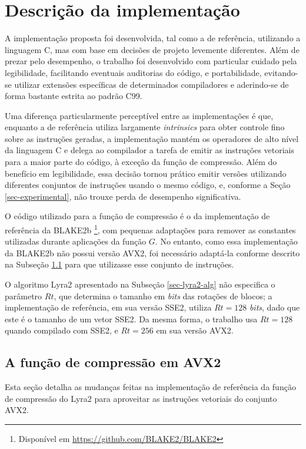 \documentclass{article}
\begin{document}
\section{Descrição da implementação}

A implementação proposta foi desenvolvida, tal como a de referência, utilizando
a linguagem C, mas com base em decisões de projeto levemente diferentes. Além
de prezar pelo desempenho, o trabalho foi desenvolvido com particular cuidado
pela legibilidade, facilitando eventuais auditorias do código, e portabilidade,
evitando-se utilizar extensões específicas de determinados compiladores e
aderindo-se de forma bastante estrita ao padrão C99.

Uma diferença particularmente perceptível entre as implementações é que,
enquanto a de referência utiliza largamente \emph{intrinsics} para obter
controle fino sobre as instruções geradas, a implementação mantém os
operadores de alto nível da linguagem C e delega ao compilador a tarefa
de emitir as instruções vetoriais para a maior parte do código, à
exceção da função de compressão. Além do benefício em legibilidade, essa
decisão tornou prático emitir versões utilizando diferentes conjuntos de
instruções usando o mesmo código, e, conforme a Seção
\ref{sec-experimental}, não trouxe perda de desempenho significativa.

O código utilizado para a função de compressão é o da implementação de
referência da BLAKE2b \footnote{Disponível em
  \url{https://github.com/BLAKE2/BLAKE2}}, com pequenas adaptações para
remover as constantes utilizadas durante aplicações da função $G$. No
entanto, como essa implementação da BLAKE2b não possui versão AVX2, foi
necessário adaptá-la conforme descrito na Subseção \ref{sec-compression-fn-avx2}
para que utilizasse esse conjunto de instruções.

O algoritmo Lyra2 apresentado na Subseção \ref{sec-lyra2-alg} não
especifica o parâmetro $Rt$, que determina o tamanho em \emph{bits} das
rotações de blocos; a implementação de referência, em sua versão SSE2,
utiliza $Rt = 128$ \emph{bits}, dado que este é o tamanho de um vetor SSE2.
Da mesma forma, o trabalho usa $Rt = 128$ quando compilado com
SSE2, e $Rt = 256$ em sua versão AVX2.

\subsection{A função de compressão em AVX2 }\label{sec-compression-fn-avx2}

Esta seção detalha as mudanças feitas na implementação de referência da
função de compressão do Lyra2 para aproveitar as instruções vetoriais do
conjunto AVX2.
\end{document}
